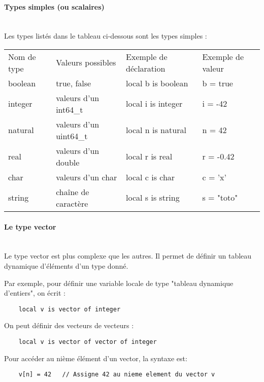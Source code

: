 \paragraph{Types simples (ou scalaires)}\mbox{} \\
Les types listés dans le tableau ci-dessous sont les types simples : \\
\begin{tabular}{ l | l | l | l }
    Nom de type     & Valeurs possibles      & Exemple de déclaration & Exemple de valeur \\
    boolean         & true, false            & local b is boolean     & b = true          \\
    integer         & valeurs d'un int64\_t  & local i is integer     & i = -42           \\
    natural         & valeurs d'un uint64\_t & local n is natural     & n = 42            \\
    real            & valeurs d'un double    & local r is real        & r = -0.42         \\
    char            & valeurs d'un char      & local c is char        & c = 'x'           \\
    string          & chaîne de caractère    & local s is string      & s = "toto"        \\
\end{tabular}

\paragraph{Le type vector}\mbox{} \\

Le type vector est plus complexe que les autres. Il permet de définir un tableau
dynamique d'éléments d'un type donné.

Par exemple, pour définir une variable locale de type "tableau dynamique d'entiers",
on écrit :
\begin{verbatim}
    local v is vector of integer
\end{verbatim}

On peut définir des vecteurs de vecteurs :
\begin{verbatim}
    local v is vector of vector of integer
\end{verbatim}

Pour accéder au nième élément d'un vector, la syntaxe est:
\begin{verbatim}
    v[n] = 42   // Assigne 42 au nieme element du vector v
\end{verbatim}

